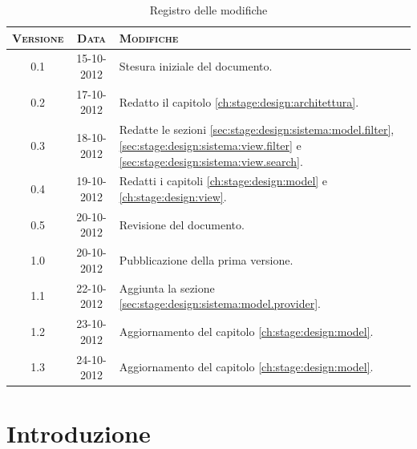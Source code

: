 \documentclass[10pt,a4paper,headinclude,footinclude,hidelinks]{scrreprt} %
\begin{document}
    \title{\rmfamily\normalfont{}}
    \author{}
    \date{\today}
    
    \maketitle
    
    \begin{abstract}
        \noindent Il documento riporta le informazioni di progettazione riguardanti l'interfaccia grafica per la visualizzazione e la navigazione dei contenuti.
    \end{abstract}
    
	\begin{table}[ht]
	\centering
	\begin{tabular}{|c|c|l|}
	\hline
	\textsc{Versione} & \textsc{Data} & \textsc{Modifiche} \\ \hline
	0.1 & 15-10-2012 & Stesura iniziale del documento. \\ \hline
	0.2 & 17-10-2012 & Redatto il capitolo \ref{ch:stage:design:architettura}. \\ \hline
	0.3 & 18-10-2012 & Redatte le sezioni \ref{sec:stage:design:sistema:model.filter}, \ref{sec:stage:design:sistema:view.filter} e \ref{sec:stage:design:sistema:view.search}. \\ \hline
	0.4 & 19-10-2012 & Redatti i capitoli \ref{ch:stage:design:model} e \ref{ch:stage:design:view}. \\ \hline
	0.5 & 20-10-2012 & Revisione del documento. \\ \hline
	1.0 & 20-10-2012 & Pubblicazione della prima versione. \\ \hline
	1.1 & 22-10-2012 & Aggiunta la sezione \ref{sec:stage:design:sistema:model.provider}. \\ \hline
	1.2 & 23-10-2012 & Aggiornamento del capitolo \ref{ch:stage:design:model}. \\ \hline
	1.3 & 24-10-2012 & Aggiornamento del capitolo \ref{ch:stage:design:model}. \\ \hline
	\end{tabular}
	\caption{Registro delle modifiche}
	\label{tab:stage:wp:workload}
	\end{table}

	\tableofcontents

	\chapter{Introduzione}
	\label{ch:stage:design:intro}
\end{document}
